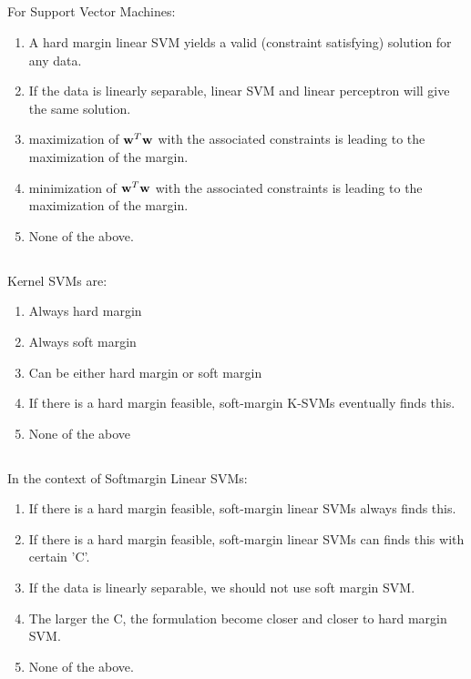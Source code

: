 \begin{frame}
\section{}
For Support Vector Machines:

\begin{enumerate}[label=(\Alph*)]
\item A hard margin linear SVM yields a valid (constraint satisfying) solution for any data.
\item If the data is linearly separable, linear SVM and linear perceptron will give the same solution.
\item maximization of ${\bf w}^T{\bf w}$ with the associated constraints is leading to the maximization of the margin.
\item minimization of ${\bf w}^T{\bf w}$ with the associated constraints is leading to the maximization of the margin.    %
\item None of the above.  %
\end{enumerate}
\end{frame}

\begin{frame}
\section{}
Kernel SVMs are:
\begin{enumerate}[label=(\Alph*)]
\item Always hard margin
\item Always soft margin
\item Can be either hard margin or soft margin    %
\item If there is a hard margin feasible, soft-margin K-SVMs eventually finds this.
\item None of the above    %
\end{enumerate}
\end{frame}

\begin{frame}
\section{}
In the context of Softmargin Linear SVMs:
\begin{enumerate}[label=(\Alph*)]
\item If there is a hard margin feasible, soft-margin linear SVMs always finds this.
\item If there is a hard margin feasible, soft-margin linear SVMs can finds this with certain 'C'.    %
\item If the data is linearly separable, we should not use soft margin SVM.
\item The larger the C, the formulation become closer and closer to hard margin SVM.    %
\item None of the above.  %
\end{enumerate}
\end{frame}


